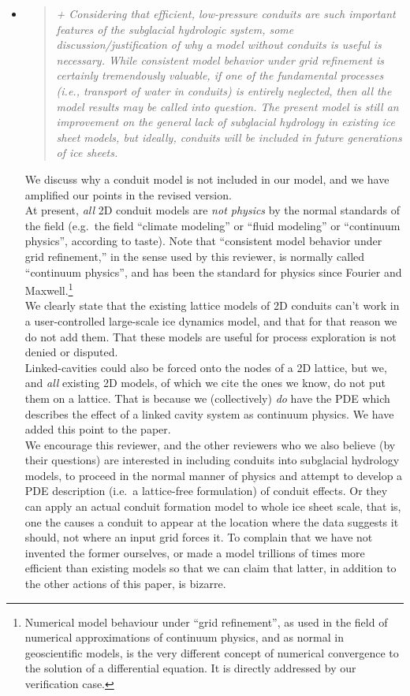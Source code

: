 \documentclass[11pt,reqno]{amsart}
\newcommand{\reply}[2]{
\medskip\medskip
\item  \begin{quote}
\emph{#1}
\end{quote}

\medskip
\noindent #2}
\begin{document}
\begin{itemize}
\reply{+ Considering that efficient, low-pressure conduits are such important features of the subglacial hydrologic system, some discussion/justification of why a model without conduits is useful is necessary.  While consistent model behavior under grid refinement is certainly tremendously valuable, if one of the fundamental processes (i.e., transport of water in conduits) is entirely neglected, then all the model results may be called into question.  The present model is still an improvement on the general lack of subglacial hydrology in existing ice sheet models, but ideally, conduits will be included in future generations of ice sheets.}
{We discuss why a conduit model is not included in our model, and we have amplified our points in the revised version.\\
\indent  At present, \emph{all} 2D conduit models are \emph{not physics} by the normal standards of the field (e.g.~the field ``climate modeling'' or ``fluid modeling'' or ``continuum physics'', according to taste).  Note that ``consistent model behavior under grid refinement,'' in the sense used by this reviewer, is normally called ``continuum physics'', and has been the standard for physics since Fourier and Maxwell.\footnote{Numerical model behaviour under ``grid refinement'', as used in the field of numerical approximations of continuum physics, and as normal in geoscientific models, is the very different concept of numerical convergence to the solution of a differential equation.  It is directly addressed by our verification case.} \\
\indent We clearly state that the existing lattice models of 2D conduits can't work in a user-controlled large-scale ice dynamics model, and that for that reason we do not add them.  That these models are useful for process exploration is not denied or disputed.\\
\indent Linked-cavities could also be forced onto the nodes of a 2D lattice, but we, and \emph{all} existing 2D models, of which we cite the ones we know, do not put them on a lattice.  That is because we (collectively) \emph{do} have the PDE which describes the effect of a linked cavity system as continuum physics.  We have added this point to the paper. \\
\indent We encourage this reviewer, and the other reviewers who we also believe (by their questions) are interested in including conduits into subglacial hydrology models, to proceed in the normal manner of physics and attempt to develop a PDE description (i.e.~a lattice-free formulation) of conduit effects.  Or they can apply an actual conduit formation model to whole ice sheet scale, that is, one the causes a conduit to appear at the location where the data suggests it should, not where an input grid forces it.  To complain that we have not invented the former ourselves, or made a model trillions of times more efficient than existing models so that we can claim that latter, in addition to the other actions of this paper, is bizarre.\\
}
\end{itemize}
\end{document}
